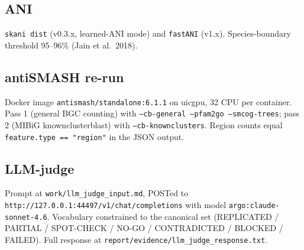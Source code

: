 \documentclass[11pt,letterpaper]{article}
\begin{document}
\subsection{ANI}
\texttt{skani dist} (v0.3.x, learned-ANI mode) and \texttt{fastANI} (v1.x). Species-boundary threshold 95--96\% (Jain et al.\ 2018).

\subsection{antiSMASH re-run}
Docker image \texttt{antismash/standalone:6.1.1} on uicgpu, 32 CPU per container. Pass 1 (general BGC counting) with \texttt{--cb-general --pfam2go --smcog-trees}; pass 2 (MIBiG knownclusterblast) with \texttt{--cb-knownclusters}. Region counts equal \texttt{feature.type == "region"} in the JSON output.

\subsection{LLM-judge}
Prompt at \texttt{work/llm\_judge\_input.md}, POSTed to \texttt{http://127.0.0.1:44497/v1/chat/completions} with model \texttt{argo:claude-sonnet-4.6}. Vocabulary constrained to the canonical set (REPLICATED / PARTIAL / SPOT-CHECK / NO-GO / CONTRADICTED / BLOCKED / FAILED). Full response at \texttt{report/evidence/llm\_judge\_response.txt}.
\end{document}
